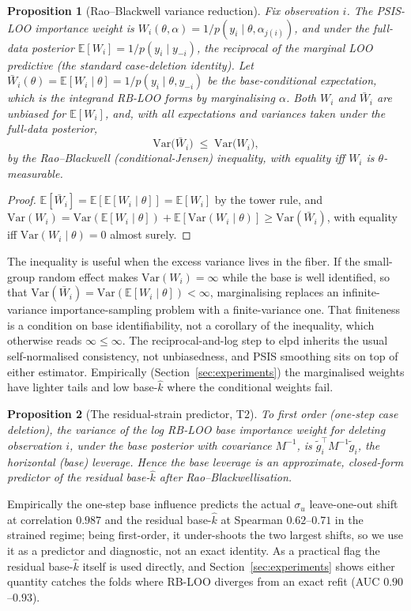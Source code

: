 \documentclass[11pt]{article}
\newtheorem{proposition}{Proposition}
\newcommand{\khat}{\hat{k}}
\newcommand{\Var}{\mathrm{Var}}
\newcommand{\E}{\mathbb{E}}
\begin{document}
\begin{proposition}[Rao--Blackwell variance reduction]\label{thm:rb}
Fix observation $i$. The PSIS-LOO importance weight is
$W_i(\theta,\alpha)=1/p(y_i\mid\theta,\alpha_{j(i)})$, and under the full-data
posterior $\E[W_i]=1/p(y_i\mid y_{-i})$, the reciprocal of the marginal LOO
predictive (the standard case-deletion identity). Let $\bar W_i(\theta)=\E[W_i\mid\theta]
= 1/p(y_i\mid\theta,y_{-i})$ be the base-conditional expectation, which is the
integrand RB-LOO forms by marginalising $\alpha$. Both $W_i$ and $\bar W_i$ are
unbiased for $\E[W_i]$, and, with all expectations and variances taken under the
full-data posterior,
\[
\Var\big(\bar W_i\big)\;\le\;\Var\big(W_i\big),
\]
by the Rao--Blackwell (conditional-Jensen) inequality, with equality iff $W_i$ is
$\theta$-measurable.
\end{proposition}
\begin{proof}
$\E[\bar W_i]=\E[\E[W_i\mid\theta]]=\E[W_i]$ by the tower rule, and
$\Var(W_i)=\Var(\E[W_i\mid\theta])+\E[\Var(W_i\mid\theta)]\ge\Var(\bar W_i)$, with
equality iff $\Var(W_i\mid\theta)=0$ almost surely.
\end{proof}
The inequality is useful when the excess variance lives in the fiber. If the
small-group random effect makes $\Var(W_i)=\infty$ while the base is well identified,
so that $\Var(\bar W_i)=\Var(\E[W_i\mid\theta])<\infty$, marginalising replaces an
infinite-variance importance-sampling problem with a finite-variance one. That
finiteness is a condition on base identifiability, not a corollary of the inequality,
which otherwise reads $\infty\le\infty$. The reciprocal-and-log step to elpd inherits
the usual self-normalised consistency, not unbiasedness, and PSIS smoothing sits on
top of either estimator. Empirically (Section~\ref{sec:experiments}) the marginalised
weights have lighter tails and low base-$\khat$ where the conditional weights fail.

\begin{proposition}[The residual-strain predictor, T2]\label{thm:t2}
To first order (one-step case deletion), the variance of the log RB-LOO base
importance weight for deleting observation $i$, under the base posterior with
covariance $M^{-1}$, is $\tilde g_i^\top M^{-1}\tilde g_i$, the horizontal (base)
leverage. Hence the base leverage is an approximate, closed-form predictor of the
residual base-$\khat$ after Rao--Blackwellisation.
\end{proposition}
Empirically the one-step base influence predicts the actual $\sigma_u$
leave-one-out shift at correlation $0.987$ and the residual base-$\khat$ at Spearman
$0.62$--$0.71$ in the strained regime; being first-order, it under-shoots the two
largest shifts, so we use it as a predictor and diagnostic, not an exact identity.
As a practical flag the residual base-$\khat$ itself is used directly, and
Section~\ref{sec:experiments} shows either quantity catches the folds where RB-LOO
diverges from an exact refit (AUC $0.90$--$0.93$).
\end{document}
